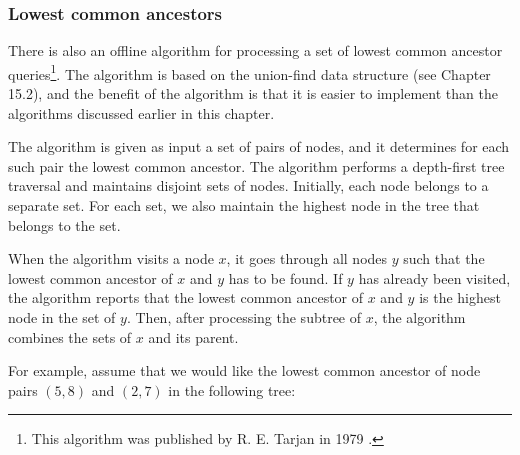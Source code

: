 \subsubsection{Lowest common ancestors}

There is also an offline algorithm
for processing a set of
lowest common ancestor queries\footnote{This
algorithm was published by R. E. Tarjan in 1979 \cite{tar79}.}.
The algorithm is based on the union-find data structure
(see Chapter 15.2), and the benefit of the algorithm is
that it is easier to implement than the
algorithms discussed earlier in this chapter.

The algorithm is given as input a set of pairs of nodes,
and it determines for each such pair the
lowest common ancestor.
The algorithm performs a depth-first tree traversal
and maintains disjoint sets of nodes.
Initially, each node belongs to a separate set.
For each set, we also maintain the highest node in the
tree that belongs to the set.

When the algorithm visits a node $x$,
it goes through all nodes $y$ such that
the lowest common ancestor of $x$ and $y$
has to be found.
If $y$ has already been visited,
the algorithm reports that the 
lowest common ancestor of $x$ and $y$
is the highest node in the set of $y$.
Then, after processing the subtree of $x$,
the algorithm combines the sets of $x$ and its parent.

For example, assume that we would like the lowest
common ancestor of node pairs $(5,8)$
and $(2,7)$ in the following tree:
\begin{center}
\end{center}

